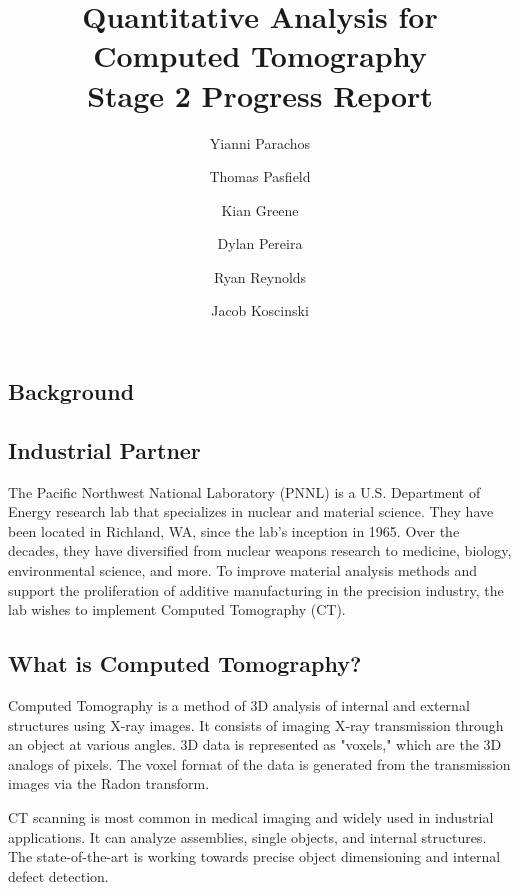 \documentclass[11pt, letterpaper, notitlepage]{article}
\title{%
  Quantitative Analysis for Computed Tomography\\
  \large \vspace{1em}\textbf{Stage 2 Progress Report}
}
\author{Yianni Parachos}
\author{Thomas Pasfield}
\author{Kian Greene}
\author{Dylan Pereira}
\author{Ryan Reynolds}
\author{Jacob Koscinski}
\affil{Embry-Riddle Aeronautical University, Daytona Beach, FL.}
\affil{\small Industry Representatives: Aaron Luttman\footnote{Pacific Northwest National Laboratory Richland, WA.}\;, Margaret Lund$^*$}
\begin{document}
\maketitle


\begin{multicols}{2}
\section{Background}
  \subsection{Industrial Partner}
    The Pacific Northwest National Laboratory (PNNL) is a U.S. Department of Energy research lab that specializes in nuclear and material science. They have been located in Richland, WA, since the lab's inception in 1965. Over the decades, they have diversified from nuclear weapons research to medicine, biology, environmental science, and more.\cite{noauthor_national_nodate} To improve material analysis methods and support the proliferation of additive manufacturing in the precision industry, the lab wishes to implement Computed Tomography (CT).

  \subsection{What is Computed Tomography?}
    Computed Tomography is a method of 3D analysis of internal and external structures using X-ray images. It consists of imaging X-ray transmission through an object at various angles. 3D data is represented as "voxels," which are the 3D analogs of pixels. The voxel format of the data is generated from the transmission images via the Radon transform.

    CT scanning is most common in medical imaging and widely used in industrial applications. It can analyze assemblies, single objects, and internal structures. The state-of-the-art is working towards precise object dimensioning and internal defect detection.


\end{multicols}
\end{document}
